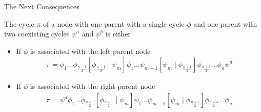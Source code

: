 \begin{frame}{The Next Consequences}
	\begin{theorem}
		The cycle $\pi$ of a node with one parent with a single cycle $\phi$ and one parent with two coexisting cycles $\psi^a$ and $\psi^b$ is either
		\begin{itemize}
			\item If $\phi$ is associated with the left parent node
			      \begin{align*}
				      \pi = \phi_1 \dots \phi_{\frac{n-1}{2}} \left[\phi_{\frac{n+1}{2}} \mid \psi_m\right] \psi_1 \dots \psi_{m-1} \left[\psi_m \mid \phi_{\frac{n+1}{2}}\right] \phi_{\frac{n+3}{2}} \dots \phi_n \psi^a
			      \end{align*}
			\item If $\phi$ is associated with the right parent node
			      \begin{align*}
				      \pi = \psi^a \phi_1 \dots \phi_{\frac{n-1}{2}} \left[\phi_{\frac{n+1}{2}} \mid \psi_m\right] \psi_1 \dots \psi_{m-1} \left[\psi_m \mid \phi_{\frac{n+1}{2}}\right] \phi_{\frac{n+3}{2}} \dots \phi_n
			      \end{align*}
		\end{itemize}
	\end{theorem}
\end{frame}

\begin{frame}
\end{frame}
